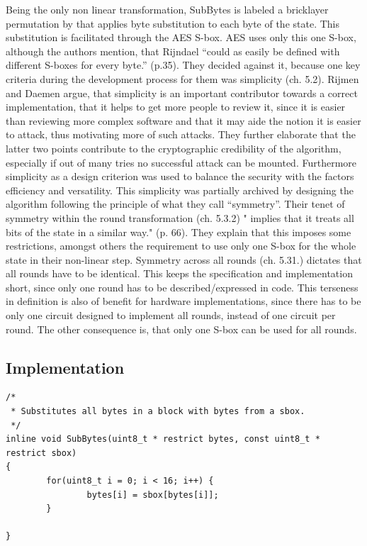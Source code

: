 Being the only non linear transformation, SubBytes is labeled a
bricklayer permutation by \cite[p. 34]{rijndael} that applies byte substitution to
each byte of the state. This substitution is facilitated through the
AES S-box. AES uses
only this one S-box, although the authors mention, that Rijndael ``could
as easily be defined with different S-boxes for every byte.'' (p.35).
They decided against it, because one key criteria during the
development process for them was simplicity (ch. 5.2). Rijmen and
Daemen argue, that simplicity is an important contributor towards a
correct implementation, that it helps to get more people to review it,
since it is easier than reviewing more complex software and that it may
aide the notion it is easier to attack, thus motivating more of such
attacks. They further elaborate that the latter two points contribute to
the cryptographic credibility of the algorithm, especially if out of
many tries no successful attack can be mounted. Furthermore simplicity as
a design criterion was used to balance the security with the factors
efficiency and versatility. This simplicity was partially archived by
designing the algorithm following the principle of what they call
``symmetry''. Their tenet of symmetry within the round transformation
(ch. 5.3.2) " implies that it treats all bits of the state in a similar
way." (p. 66). They explain that this imposes some restrictions, amongst
others the requirement to use only one S-box for the whole state in their
non-linear step. Symmetry across all rounds (ch. 5.31.) dictates that
all rounds have to be identical. This keeps the specification and
implementation short, since only one round has to be described/expressed
in code. This terseness in definition is also of benefit for hardware
implementations, since there has to be only one circuit designed to
implement all rounds, instead of one circuit per round. The other consequence is,
that only one S-box can be used for all rounds.

\hypertarget{implementation-8}{%
\subsection{Implementation}\label{implementation-8}}

\begin{lstlisting}
/*
 * Substitutes all bytes in a block with bytes from a sbox.
 */
inline void SubBytes(uint8_t * restrict bytes, const uint8_t * restrict sbox)
{
        for(uint8_t i = 0; i < 16; i++) {
                bytes[i] = sbox[bytes[i]];
        }

}
\end{lstlisting}

